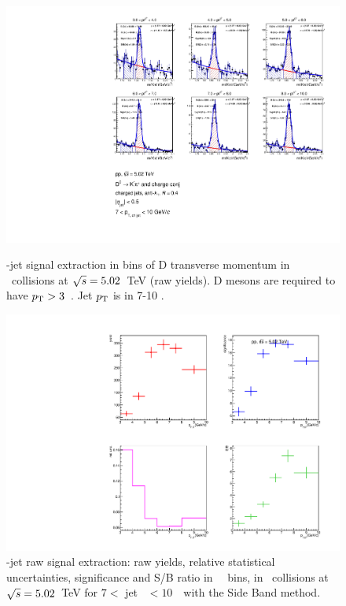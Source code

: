 \begin{figure}[bth]
\centering
\begin{minipage}{.65\textwidth}
  \centering
  \includegraphics[width=\linewidth]{pp_2sig/R4_jetbin_7_10/invMass_pTD3}
\caption{\Dzero-jet signal extraction in bins of D transverse momentum in \pp\ collisions at $\sqrt{s}=5.02$~TeV (raw yields). D mesons are required to have $p_{\rm T}>3$~\GeVc. Jet $p_{\rm T}$ is in 7-10 \GeVc.
}
\label{fig:eq_pp_InvMass_Dzero_7_10_R4}
\end{minipage}%
\begin{minipage}{.4\textwidth}
  \centering
  \includegraphics[width=\linewidth]{pp_2sig/R4_jetbin_7_10/signalParams_pTD3}
\caption{%
\Dzero-jet raw signal extraction: raw yields, relative statistical uncertainties, significance and S/B ratio in \Dzero\ \pt\ bins, in \pp\ collisions at $\sqrt{s}=5.02$~TeV for $7<$ jet \pt\ $<10$~\GeVc\ with the Side Band method.
}
\label{fig:eq_pp_signalParams_7_10_R4}
\end{minipage}
\end{figure}
